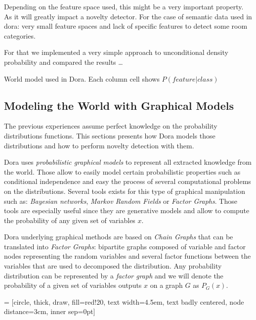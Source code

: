 \documentclass[a4paper]{article}
\begin{document}
Depending on the feature space used, this might be a very important property.
As it will greatly impact a novelty detector. For the case of semantic data used in dora:
very small feature spaces and lack of specific features to detect some room categories.

For that we implemented a very simple approach to unconditional density probability and compared the results
\dots

\begin{sidewaystable}[h]
\begin{center}
\scalebox{0.50}{}
\end{center}
\caption{\label{tab:dora-world-distribution}World model used in Dora. Each column cell shows $P(feature|class)$}
\end{sidewaystable}


\clearpage
\subsection{Modeling the World with Graphical Models}
The previous experiences assume perfect knowledge on the probability distributions functions.
This sections presents how Dora models those distributions and how to perform novelty detection with them.

Dora uses \emph{probabilistic graphical models} to represent all extracted knowledge from the world.
Those allow to easily model certain probabilistic properties such as conditional independence
and easy the process of several computational problems on the distributions.
Several tools exists for this type of graphical manipulation such as: \emph{Bayesian networks}, \emph{Markov Random Fields}
or \emph{Factor Graphs}.
Those tools are especially useful since they are generative models and allow to compute the probability of any given set of variables $x$.

Dora underlying graphical methods are based on \emph{Chain Graphs} that can be translated into \emph{Factor Graphs}\citep{kschischang2001factor}: bipartite graphs composed of variable and factor nodes representing the random variables and several factor functions between the variables that are used to decomposed the distribution.
Any probability distribution can be represented by a \emph{factor graph} and we will denote the probability of a given set of variables outputs $x$ on a graph $G$ as $P_G(x)$.


 = [circle,
                   thick,
                   draw, fill=red!20,
                   text width=4.5em,
                   text badly centered,
                   node distance=3cm,
                   inner sep=0pt]
\end{document}
